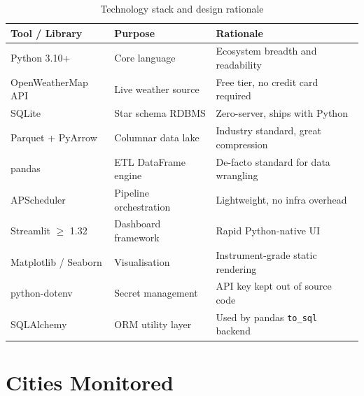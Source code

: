 \documentclass[12pt,a4paper]{report}
\begin{document}
\begin{table}[H]
  \centering
  \caption{Technology stack and design rationale}
  \label{tab:techstack}
  \begin{tabular}{l l p{6cm}}
    \toprule
    \textbf{Tool / Library} & \textbf{Purpose} & \textbf{Rationale} \\
    \midrule
    Python 3.10+       & Core language      & Ecosystem breadth and readability \\
    OpenWeatherMap API & Live weather source & Free tier, no credit card required \\
    SQLite             & Star schema RDBMS  & Zero-server, ships with Python \\
    Parquet + PyArrow  & Columnar data lake & Industry standard, great compression \\
    pandas             & ETL DataFrame engine & De-facto standard for data wrangling \\
    APScheduler        & Pipeline orchestration & Lightweight, no infra overhead \\
    Streamlit $\geq$ 1.32 & Dashboard framework & Rapid Python-native UI \\
    Matplotlib / Seaborn & Visualisation    & Instrument-grade static rendering \\
    python-dotenv      & Secret management  & API key kept out of source code \\
    SQLAlchemy         & ORM utility layer  & Used by pandas \texttt{to\_sql} backend \\
    \bottomrule
  \end{tabular}
\end{table}

\section{Cities Monitored}
\end{document}
